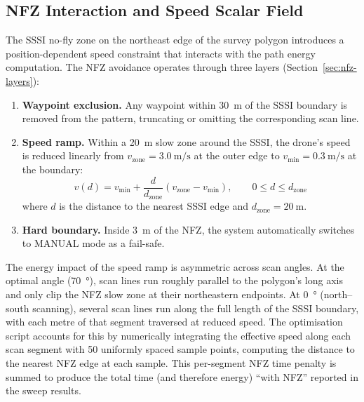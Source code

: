 \subsection{NFZ Interaction and Speed Scalar Field}\label{sec:nfz-interaction}

The SSSI no-fly zone on the northeast edge of the survey polygon introduces a position-dependent speed constraint that interacts with the path energy computation.
The NFZ avoidance operates through three layers (Section~\ref{sec:nfz-layers}):

\begin{enumerate}
  \item \textbf{Waypoint exclusion.} Any waypoint within \SI{30}{\metre} of the SSSI boundary is removed from the pattern, truncating or omitting the corresponding scan line.
  \item \textbf{Speed ramp.} Within a \SI{20}{\metre} slow zone around the SSSI, the drone's speed is reduced linearly from $v_{\mathrm{zone}} = \SI{3.0}{\metre\per\second}$ at the outer edge to $v_{\mathrm{min}} = \SI{0.3}{\metre\per\second}$ at the boundary:
  \begin{equation}\label{eq:speed-ramp}
    v(d) = v_{\mathrm{min}} + \frac{d}{d_{\mathrm{zone}}} \left(v_{\mathrm{zone}} - v_{\mathrm{min}}\right), \qquad 0 \leq d \leq d_{\mathrm{zone}}
  \end{equation}
  where $d$ is the distance to the nearest SSSI edge and $d_{\mathrm{zone}} = \SI{20}{\metre}$.
  \item \textbf{Hard boundary.} Inside \SI{3}{\metre} of the NFZ, the system automatically switches to MANUAL mode as a fail-safe.
\end{enumerate}

The energy impact of the speed ramp is asymmetric across scan angles.
At the optimal angle (\SI{70}{\degree}), scan lines run roughly parallel to the polygon's long axis and only clip the NFZ slow zone at their northeastern endpoints.
At \SI{0}{\degree} (north--south scanning), several scan lines run along the full length of the SSSI boundary, with each metre of that segment traversed at reduced speed.
The optimisation script accounts for this by numerically integrating the effective speed along each scan segment with 50 uniformly spaced sample points, computing the distance to the nearest NFZ edge at each sample.
This per-segment NFZ time penalty is summed to produce the total time (and therefore energy) ``with NFZ'' reported in the sweep results.


